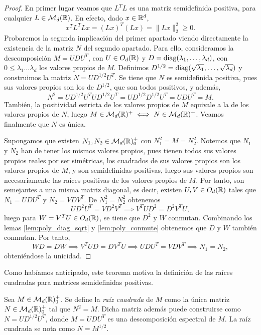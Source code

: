 \begin{proof}
    En primer lugar veamos que $L^TL$ es una matriz semidefinida positiva, para cualquier $L \in \mathcal{M}_d(\mathbb{R})$. En efecto, dado $x \in \mathbb{R}^d$,
    \[ x^TL^TLx = (Lx)^T(Lx) = \|Lx\|^2_2 \ge 0. \]
    Probaremos la segunda implicación del primer apartado viendo directamente la existencia de la matriz $N$ del segundo apartado. Para ello, consideramos la descomposición $M = UDU^T$, con $U \in O_d(\mathbb{R})$ y $D = \operatorname{diag}(\lambda_1,\dots,\lambda_d)$, con $0 \le \lambda_1 \dots \lambda_d$ los valores propios de $M$. Definimos $D^{1/2} = \operatorname{diag}(\sqrt{\lambda_1},\dots,\sqrt{\lambda_d})$ y construimos la matriz $N = UD^{1/2}U^T$. Se tiene que $N$ es semidefinida positiva, pues sus valores propios son los de $D^{1/2}$, que son todos positivos, y además, 
    \[N^2 = UD^{1/2}U^TUD^{1/2}U^T = UD^{1/2}D^{1/2}U^T = UDU^T = M.\]
    También, la positividad estricta de los valores propios de $M$ equivale a la de los valores propios de $N$, luego $M \in \mathcal{M}_d(\mathbb{R})^+ \iff N \in \mathcal{M}_d(\mathbb{R})^+$. Veamos finalmente que $N$ es única.

    Supongamos que existen $N_1, N_2 \in \mathcal{M}_d(\mathbb{R})^+_0$ con $N_1^2 = M = N_2^2$. Notemos que $N_1$ y $N_2$ han de tener los mismos valores propios, pues tienen todos sus valores propios reales por ser simétricas, los cuadrados de sus valores propios son los valores propios de $M$, y son semidefinidas positivas, luego sus valores propios son necesariamente las raíces positivas de los valores propios de $M$. Por tanto, son semejantes a una misma matriz diagonal, es decir, existen $U, V \in O_d(\mathbb{R})$ tales que $N_1 = UDU^T$ y $N_2 = VDV^T$. De $N_1^2 = N_2^2$ obtenemos
    \[ UD^2U^T = VD^2V^T \implies V^TUD^2 = D^2V^TU, \]
    luego para $W = V^TU \in O_d(\mathbb{R})$, se tiene que $D^2$ y $W$ conmutan. Combinando los lemas \ref{lem:poly_diag_sqrt} y \ref{lem:poly_conmute} obtenemos que $D$ y $W$ también conmutan. Por tanto,
    \[WD = DW \implies V^TUD = DV^TU \implies UDU^T = VDV^T \implies N_1 = N_2, \]
    obteniéndose la unicidad.
\end{proof}

Como habíamos anticipado, este teorema motiva la definición de las raíces cuadradas para matrices semidefinidas positivas.

\begin{definition}
    Sea $M \in \mathcal{M}_d(\mathbb{R})^+_0$. Se define la \emph{raíz cuadrada} de $M$ como la única matriz $N \in \mathcal{M}_d(\mathbb{R})^+_0$ tal que $N^2 = M$. Dicha matriz además puede construirse como $N = UD^{1/2}U^T$, donde $M = UDU^T$ es una descomposición espectral de $M$. La raíz cuadrada se nota como $N = M^{1/2}$.
\end{definition}

